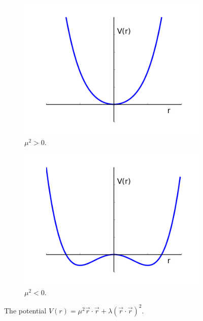 \begin{figure}[htbp]
  \centering
  \begin{subfigure}{0.45\textwidth}
    \centering
    \includegraphics[width=\textwidth]{higgs_pot_mup}
    \caption{$\mu^{2}>0$.}
    \label{fig:higgs_pot_mup}
  \end{subfigure}
  \begin{subfigure}{0.45\textwidth}
    \centering
    \includegraphics[width=\textwidth]{higgs_pot_mum}
    \caption{$\mu^{2}<0$.}
    \label{fig:higgs_pot_mum}
  \end{subfigure}
  \caption{The potential $ V(r) = \mu^{2} \vec{r} \cdot \vec{r} + \lambda (
\vec{r} \cdot \vec{r} )^{2}$.}
  \label{fig:higgs_pot}
\end{figure}

